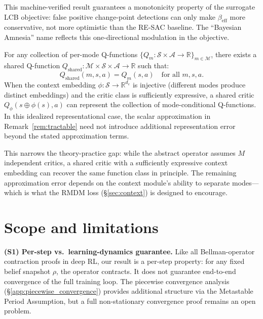 \noindent This machine-verified result guarantees a monotonicity property of the surrogate LCB objective: false positive change-point detections can only make $\beta_{\text{eff}}$ more conservative, not more optimistic than the RE-SAC baseline. The ``Bayesian Amnesia'' name reflects this one-directional modulation in the objective.

\begin{proposition}
    \label{prop:context_equiv}
    For any collection of per-mode Q-functions $\{Q_m : \mathcal{S} \times \mathcal{A} \to \mathbb{R}\}_{m \in \mathcal{M}}$, there exists a shared Q-function $Q_{\text{shared}} : \mathcal{M} \times \mathcal{S} \times \mathcal{A} \to \mathbb{R}$ such that:
    \begin{equation}
        Q_{\text{shared}}(m, s, a) = Q_m(s, a) \quad \text{for all } m, s, a.
    \end{equation}
    When the context embedding $\phi: \mathcal{S} \to \mathbb{R}^{d_e}$ is injective (different modes produce distinct embeddings) and the critic class is sufficiently expressive, a shared critic $Q_\phi(s \oplus \phi(s), a)$ can represent the collection of mode-conditional Q-functions. In this idealized representational case, the scalar approximation in Remark~\ref{rem:tractable} need not introduce additional representation error beyond the stated approximation terms.
\end{proposition}

\noindent This narrows the theory-practice gap: while the abstract operator assumes $M$ independent critics, a shared critic with a sufficiently expressive context embedding can recover the same function class in principle. The remaining approximation error depends on the context module's ability to separate modes---which is what the RMDM loss (\S\ref{sec:context}) is designed to encourage.


\section{Scope and limitations}
\label{app:scope}

\medskip
\noindent\textbf{(S1) Per-step vs.\ learning-dynamics guarantee.}
Like all Bellman-operator contraction proofs in deep RL, our result is a per-step property: for any fixed belief snapshot $\rho$, the operator contracts. It does not guarantee end-to-end convergence of the full training loop. The piecewise convergence analysis (\S\ref{app:piecewise_convergence}) provides additional structure via the Metastable Period Assumption, but a full non-stationary convergence proof remains an open problem.

